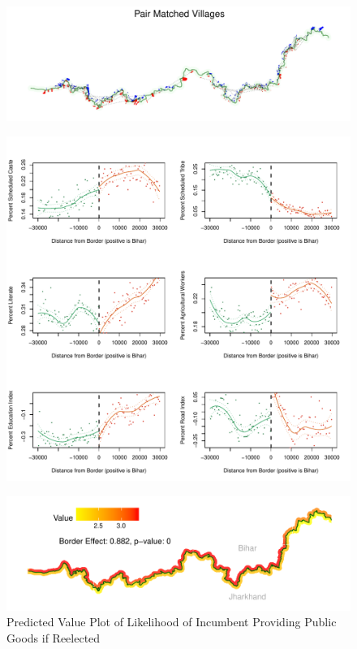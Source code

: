 \documentclass[xcolor=x11names,compress]{beamer}\usepackage[]{graphicx}\usepackage[]{color}
\makeatletter
\def\maxwidth{ %
  \ifdim\Gin@nat@width>\linewidth
    \linewidth
  \else
    \Gin@nat@width
  \fi
}
\renewcommand{\(}{\begin{columns}}
\renewcommand{\)}{\end{columns}}
\newcommand{\<}[1]{\begin{column}{#1}}
\renewcommand{\>}{\end{column}}
\makeatother
\begin{document}
\begin{frame}
\begin{figure}
\includegraphics[width=\maxwidth]{figure/Map_Border-1.pdf}
\end{figure}
\end{frame}

\begin{frame}
\begin{figure}
\includegraphics[width=\maxwidth]{figure/rdd_01-1.pdf}
\end{figure}
\end{frame}

\begin{frame}
\begin{figure}
\includegraphics[width=\maxwidth]{figure/rdd_map_incumb_dist_pg-1} \caption[Predicted Value Plot of Likelihood of Incumbent Providing Public Goods if Reelected]{Predicted Value Plot of Likelihood of Incumbent Providing Public Goods if Reelected}\label{fig:rdd_map_incumb_dist_pg}
\end{figure}
\end{frame}
\end{document}
